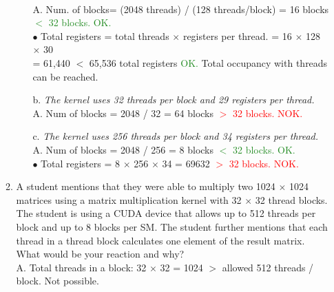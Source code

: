 \begin{enumerate}
\begin{enumerate}
\begin{itemize}
                              \\A. Num. of blocks= (2048 threads) / (128 threads/block) = 16 blocks \textcolor{ ForestGreen}{$<$ 32 blocks. OK.}\\
                              $\bullet$ Total registers = total threads $\times$ registers per thread. = 16 $\times$ 128 $\times$ 30 \\
                              = 61,440 $<$ 65,536 total registers \textcolor{ForestGreen}{OK.} Total occupancy with threads can be reached.
                        \item[b.]
                              \textsl{The kernel uses 32 threads per block and 29 registers per thread.}
                              \\A. Num of blocks = 2048 / 32 = 64 blocks \textcolor{Red}{ $>$ 32 blocks. NOK.}

                        \item[c.]
                              \textsl{The kernel uses 256 threads per block and 34 registers per thread.}
                              \\A. Num of blocks = 2048 / 256 = 8 blocks \textcolor{ ForestGreen}{$<$ 32 blocks. OK.}\\
                              $\bullet$ Total registers = 8 $\times$ 256 $\times$ 34 = 69632 \textcolor{Red}{ $>$ 32 blocks. NOK.}
                    \end{itemize}
              \item A student mentions that they were able to multiply two 1024 $\times$ 1024 matrices using a matrix multiplication kernel with 32 $\times$ 32 thread blocks. The student is using a CUDA device that allows up to 512 threads per block and up to 8 blocks per SM. The student further mentions that each thread in a thread block calculates one element of the result matrix. What would be your reaction and why?
                    \\ A. Total threads in a block: 32 $\times$ 32 = 1024 $>$ allowed 512 threads / block. Not possible.
          \end{enumerate}
\end{enumerate}
\pagebreak